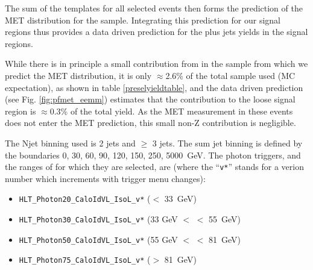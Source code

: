 

The sum of the templates for all selected \Z events then forms the 
prediction of the MET distribution for the \Z sample. Integrating this prediction for our 
signal regions  thus provides a data driven prediction for the \Z plus jets yields in the 
signal regions. 

While there is in principle a small contribution from \ttbar in the \Z sample from 
which we predict the MET distribution, it is only $\approx$2.6\% of the total sample used
(MC expectation),
as shown in table \ref{preselyieldtable}, and the data driven prediction (see Fig. 
\ref{fig:pfmet_eemm}) estimates that the \ttbar contribution to the loose signal 
region is $\approx$0.3\% of the total \Z yield. As the MET measurement in these events 
does not enter the MET prediction, this small non-Z contribution is negligible.

The Njet binning used is 2 jets and $\ge$ 3 jets. 
The sum jet \pt binning is defined by the boundaries {0, 30, 60, 90, 120, 150, 250, 5000}~GeV.
The photon triggers, and the ranges of \Z \pt for which they are selected, are (where the ``\verb=v*='' stands for a verion number which increments with trigger menu changes):

\begin{itemize}
\item \verb=HLT_Photon20_CaloIdVL_IsoL_v*= (\Z \pt $<$ 33~GeV)
\item \verb=HLT_Photon30_CaloIdVL_IsoL_v*= (33 GeV $<$ \Z \pt $<$ 55~GeV)
\item \verb=HLT_Photon50_CaloIdVL_IsoL_v*= (55 GeV $<$ \Z \pt $<$ 81~GeV)
\item \verb=HLT_Photon75_CaloIdVL_IsoL_v*= (\Z \pt $>$ 81~GeV)
\end{itemize}

